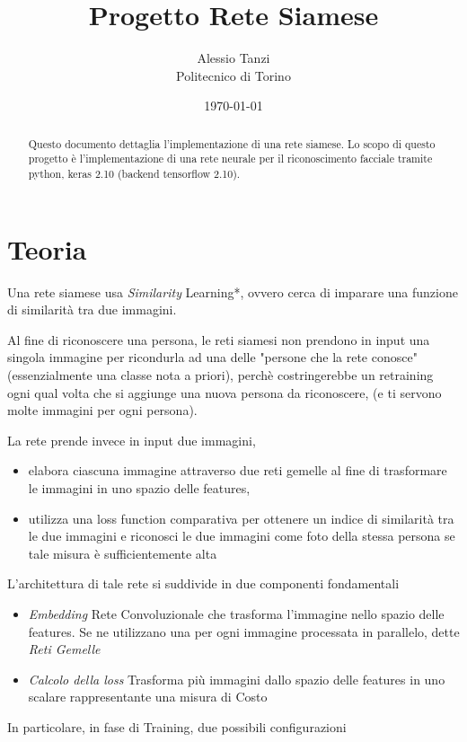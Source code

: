 \documentclass[twocolumn]{article}
\title{
    \textbf{Progetto Rete Siamese} \\[0.5cm]
}
\author{Alessio Tanzi \\ Politecnico di Torino}
\date{\today}
\begin{document}
\maketitle

\begin{abstract}
    Questo documento dettaglia l'implementazione di una rete siamese. Lo scopo di questo progetto \`e l'implementazione di una rete neurale per il riconoscimento facciale tramite
    python, keras 2.10 (backend tensorflow 2.10).
\end{abstract}

\section{Teoria}
Una rete siamese usa \textit{Similarity} Learning*, ovvero cerca di imparare una funzione di similarit\`a 
tra due immagini.\par
Al fine di riconoscere una persona, le reti siamesi non prendono in input una singola immagine 
per ricondurla ad una delle "persone che la rete conosce" (essenzialmente una classe nota a priori), 
perch\`e costringerebbe un retraining ogni qual volta che si aggiunge una nuova persona 
da riconoscere, (e ti servono molte immagini per ogni persona).\par
La rete prende invece in input due immagini, 
\begin{itemize}[topsep=0pt, noitemsep]
    \item elabora ciascuna immagine attraverso due reti gemelle al fine di trasformare le immagini 
  in uno spazio delle features,
    \item utilizza una loss function comparativa per ottenere un indice di similarit\`a tra le due immagini
  e riconosci le due immagini come foto della stessa persona se tale misura \`e sufficientemente
  alta
\end{itemize}
L'architettura di tale rete si suddivide in due componenti fondamentali
\begin{itemize}[topsep=0pt, noitemsep]
    \item \textit{Embedding} Rete Convoluzionale che trasforma l'immagine nello spazio delle features. Se ne utilizzano una per ogni immagine processata in parallelo, dette \textit{Reti Gemelle}
    \item \textit{Calcolo della loss} Trasforma pi\`u immagini dallo spazio delle features in uno scalare rappresentante una misura di Costo
\end{itemize}
In particolare, in fase di Training, due possibili configurazioni
\end{document}
